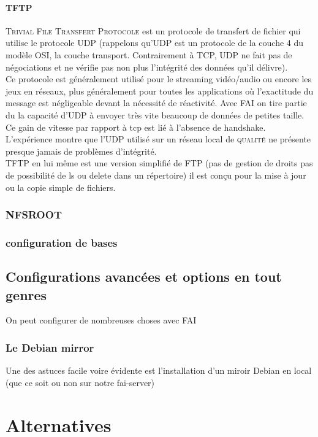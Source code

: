 \documentclass[a4paper,12pt,one side,titlepage]{report}
\begin{document}
\subsubsection{TFTP}
\textsc{Trivial File Transfert Protocole} est un protocole de transfert de fichier qui utilise  le protocole UDP (rappelons qu'UDP est un protocole de la couche 4 du modèle OSI, la couche transport. Contrairement à TCP, UDP ne fait pas de négociations et ne vérifie pas non plus l'intégrité des données qu'il délivre). \\
Ce protocole est généralement utilisé pour le streaming vidéo/audio ou encore les jeux en réseaux, plus généralement pour toutes les applications où l'exactitude du message est négligeable devant la nécessité de réactivité. Avec \textsc{FAI} on tire partie du la capacité d'UDP à envoyer très vite beaucoup de données de petites taille. Ce gain de vitesse par rapport à tcp est lié à l'absence de handshake.
L'expérience montre que l'UDP utilisé sur un réseau local de \textsc{qualité} ne présente presque jamais de problèmes d'intégrité.\\
TFTP en lui même est une version simplifié de FTP (pas de gestion de droits pas de possibilité de ls ou delete dans un répertoire) il est conçu pour la mise à jour ou la copie simple de fichiers.



\subsection{NFSROOT}


\subsection{configuration de bases}


\section{Configurations avancées et options en tout genres}
On peut configurer de nombreuses choses avec \textsc{FAI}

\subsection{Le Debian mirror}
Une des astuces facile voire évidente est l'installation d'un miroir Debian en local (que ce soit ou non sur notre fai-server)




\chapter{Alternatives}
\end{document}
